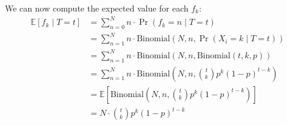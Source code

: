 
We can now compute the expected value for each $f_k$:
{
\allowdisplaybreaks
\begin{align*}
    \mathbb{E}\left[ f_k \mid T=t \right] &= \sum_{n=0}^N n \cdot \Pr(f_k = n \mid T=t) \\
    &= \sum_{n=1}^N n \cdot \mathrm{Binomial}(N, n, \Pr(X_i = k \mid T=t)) \\
    &= \sum_{n=1}^N n \cdot \mathrm{Binomial}(N, n, \mathrm{Binomial}(t, k, p)) 
    \\
    &= \sum_{n=1}^N n \cdot \mathrm{Binomial}\left( N, n, \binom{t}{k} p^k {(1-p)}^{t-k} \right) \\
    &= \mathbb{E}\left[ \mathrm{Binomial} \left( N, n, \binom{t}{k} p^k {(1-p)}^{t-k} \right) \right] \\
    &= N \cdot \binom{t}{k} p^k {(1-p)}^{t-k}
\end{align*}
}

